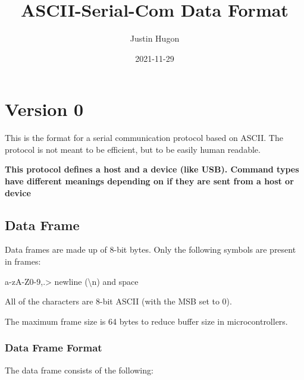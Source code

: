 \documentclass{customdocclass}
\title{ASCII-Serial-Com Data Format}
\author{Justin Hugon}
\date{2021-11-29}
\begin{document}
\maketitle

\section{Version 0}


This is the format for a serial communication protocol based on ASCII. The
protocol is not meant to be efficient, but to be easily human readable.

\textbf{This protocol defines a host and a device (like USB). Command types
have different meanings depending on if they are sent from a host or device}

\subsection{Data Frame}

Data frames are made up of 8-bit bytes. Only the following symbols are present in frames:

\vspace{1em}

a-zA-Z0-9,.> newline (\textbackslash n) and space

\vspace{1em}

All of the characters are 8-bit ASCII (with the MSB set to 0).

The maximum frame size is 64 bytes to reduce buffer size in microcontrollers.

\subsubsection{Data Frame Format}

The data frame consists of the following:
\end{document}
